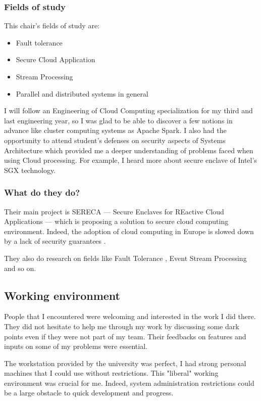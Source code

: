 \documentclass[a4paper,11pt]{report}
\begin{document}
\subsubsection{Fields of study}

This chair's fields of study are:
\begin{itemize}
\item
Fault tolerance
\item
Secure Cloud Application
\item
Stream Processing
\item
Parallel and distributed systems in general
\end{itemize}


I will follow an Engineering of Cloud Computing specialization for my third and last engineering year, so I was glad to be able to discover a few notions in advance like cluster computing systems as Apache Spark. I also had the opportunity to attend student's defenses on security aspects of Systems Architecture which provided me a deeper understanding of problems faced when using Cloud processing. For example, I heard more about secure enclave of Intel's SGX technology.

\subsubsection{What do they do?}

Their main project is SERECA --- Secure Enclaves for REactive Cloud Applications --- which is proposing a solution to secure cloud computing environment. Indeed, the adoption of cloud computing in Europe is slowed down by a lack of security guarantees \cite{tud:chair:project}.

They also do research on fields like Fault Tolerance \cite{tud:chair:papers:fault}, Event Stream Processing \cite{ tud:chair:papers:stream} and so on.

\subsection{Working environment}\label{working_environment}

People that I encountered were welcoming and interested in the work I did there. They did not hesitate to help me through my work by discussing some dark points even if they were not part of my team. Their feedbacks on features and inputs on some of my problems were essential.

The workstation provided by the university was perfect, I had strong personal machines that I could use without restrictions. This "liberal" working environment was crucial for me. Indeed, system administration restrictions could be a large obstacle to quick development and progress.
\end{document}
